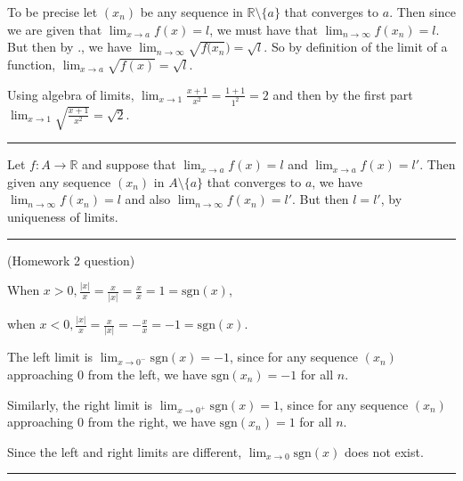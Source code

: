\documentclass[letterpaper,10pt,english]{jupyterBook}
\begin{document}
To be precise let \((x_{n})\) be any sequence in \(\mathbb{R} \setminus \{a\}\) that converges to \(a\). Then since we are given that \(\lim_{x \rightarrow a} f(x) = l\), we must have that \(\lim_{n\rightarrow\infty} f(x_{n}) = l\). But then by {\hyperref[\detokenize{Problems:p4}]{}}., we have \(\lim_{n\rightarrow\infty} \sqrt{f(x_{n}}) = \sqrt{l}\). So by definition of the limit of a function, \(\lim_{x \rightarrow a} \sqrt{f(x)} = \sqrt{l}\).

Using algebra of limits,  \(\lim_{x \rightarrow 1}\displaystyle\frac{x+1}{x^{2}}=\frac{1+1}{1^2}=2\) and
then by the first part \(\lim_{x \rightarrow 1}\sqrt{\displaystyle\frac{x+1}{x^{2}}} = \sqrt{2}\).


\bigskip\hrule\bigskip


\sphinxAtStartPar
{\hyperref[\detokenize{Problems:id6}]{}} Let \(f:A\to \mathbb{R}\) and suppose that \(\lim_{x \rightarrow a} f(x) = l\) and \(\lim_{x \rightarrow a} f(x) = l'\). Then given any sequence \((x_{n})\) in \(A \setminus \{a\}\) that converges to \(a\), we have \(\lim_{n\rightarrow\infty} f(x_{n}) = l\) and also \(\lim_{n\rightarrow\infty} f(x_{n}) = l'\). But then \(l = l'\), by uniqueness of limits.


\bigskip\hrule\bigskip


\sphinxAtStartPar
{\hyperref[\detokenize{Problems:id7}]{}} (Homework 2 question)

When \(x > 0, \displaystyle\frac{|x|}{x} = \displaystyle\frac{x}{|x|} = \displaystyle\frac{x}{x} = 1 = \text{sgn}(x)\),

when \(x < 0, \displaystyle\frac{|x|}{x} = \displaystyle\frac{x}{|x|} = -\displaystyle\frac{x}{x} = -1 = \text{sgn}(x)\).

The left limit is \(\displaystyle\lim_{x \rightarrow 0^-} \text{sgn}(x) = -1\), since for any sequence \((x_n)\) approaching \(0\) from the left, we have \(\text{sgn}(x_n) = -1\) for all \(n\).

Similarly, the right limit is \(\displaystyle\lim_{x \rightarrow 0^+} \text{sgn}(x) = 1\),  since for any sequence \((x_n)\) approaching \(0\) from the right, we have \(\text{sgn}(x_n) = 1\) for all \(n\).

Since the left and right limits are different, \(\displaystyle\lim_{x \rightarrow 0}\text{sgn}(x)\) does not exist.


\bigskip\hrule\bigskip
\end{document}
